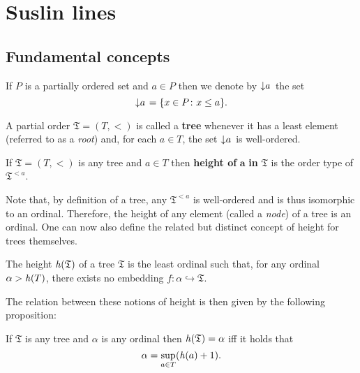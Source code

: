 \chapter{Suslin lines}

\section{Fundamental concepts}

\begin{dfn}
	If $P$ is a partially ordered set and $a\in P$ then we denote by $\left\downarrow a\right.$ the set
	\begin{equation}
		\left\downarrow a\right.=\lbrace x\in P\colon x\leq a \rbrace.
	\end{equation}
\end{dfn}

\begin{dfn}[Tree]
	A partial order $\mathfrak{T}=(T,<)$ is called a \textbf{tree} whenever it has a least element (referred to as a \textit{root}) and, for each $a\in T$, the set $\left\downarrow a\right.$ is well-ordered.
\end{dfn}

\begin{dfn}[Height]
	If $\mathfrak{T}=(T,<)$ is any tree and $a\in T$ then \textbf{height of }$\mathbf{a}$\textbf{ in }$\bm{\mathfrak{T}}$ is the order type of $\mathfrak{T}^{<a}$.
\end{dfn}

Note that, by definition of a tree, any $\mathfrak{T}^{<a}$ is well-ordered and is thus isomorphic to an ordinal.  Therefore, the height of any element (called a \textit{node}) of a tree is an ordinal.  One can now also define the related but distinct concept of height for trees themselves.

\begin{dfn}
	The height $\mathit{h}(\mathfrak{T})$ of a tree $\mathfrak{T}$ is the least ordinal such that, for any ordinal $\alpha>\mathit{h}(T)$, there exists no embedding $f\colon\alpha\hookrightarrow\mathfrak{T}$.
\end{dfn}

The relation between these notions of height is then given by the following proposition:

\begin{prp}
	If $\mathfrak{T}$ is any tree and $\alpha$ is any ordinal then $\mathit{h}(\mathfrak{T})=\alpha$ iff it holds that
	\begin{equation}
		\alpha=\sup_{a\in T}(\mathit{h}(a)+1).
	\end{equation}
\end{prp}

